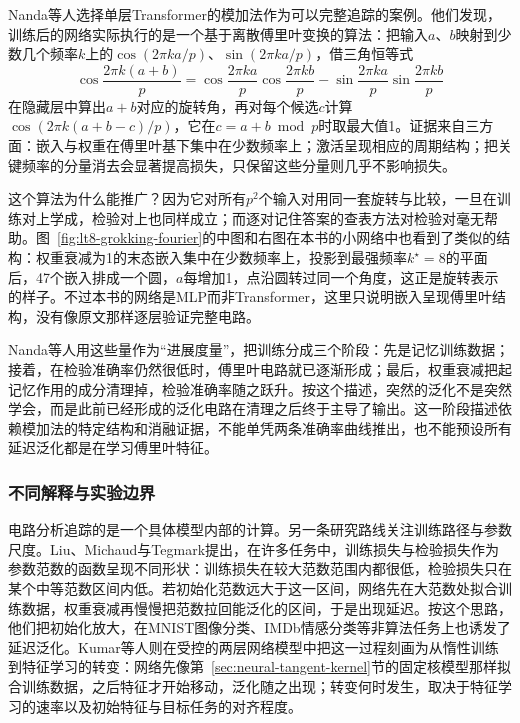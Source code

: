 Nanda等人选择单层Transformer的模加法作为可以完整追踪的案例。他们发现，训练后的网络实际执行的是一个基于离散傅里叶变换的算法：把输入$a$、$b$映射到少数几个频率$k$上的$\cos(2\pi ka/p)$、$\sin(2\pi ka/p)$，借三角恒等式
\[
 \cos\frac{2\pi k(a+b)}p=\cos\frac{2\pi ka}p\cos\frac{2\pi kb}p-\sin\frac{2\pi ka}p\sin\frac{2\pi kb}p
\]
在隐藏层中算出$a+b$对应的旋转角，再对每个候选$c$计算$\cos(2\pi k(a+b-c)/p)$，它在$c=a+b\bmod p$时取最大值1。证据来自三方面：嵌入与权重在傅里叶基下集中在少数频率上；激活呈现相应的周期结构；把关键频率的分量消去会显著提高损失，只保留这些分量则几乎不影响损失。

这个算法为什么能推广？因为它对所有$p^2$个输入对用同一套旋转与比较，一旦在训练对上学成，检验对上也同样成立；而逐对记住答案的查表方法对检验对毫无帮助。图~\ref{fig:lt8-grokking-fourier}的中图和右图在本书的小网络中也看到了类似的结构：权重衰减为1的末态嵌入集中在少数频率上，投影到最强频率$k^\star=8$的平面后，47个嵌入排成一个圆，$a$每增加1，点沿圆转过同一个角度，这正是旋转表示的样子。不过本书的网络是MLP而非Transformer，这里只说明嵌入呈现傅里叶结构，没有像原文那样逐层验证完整电路。

Nanda等人用这些量作为“进展度量”，把训练分成三个阶段：先是记忆训练数据；接着，在检验准确率仍然很低时，傅里叶电路就已逐渐形成；最后，权重衰减把起记忆作用的成分清理掉，检验准确率随之跃升。按这个描述，突然的泛化不是突然学会，而是此前已经形成的泛化电路在清理之后终于主导了输出。这一阶段描述依赖模加法的特定结构和消融证据，不能单凭两条准确率曲线推出，也不能预设所有延迟泛化都是在学习傅里叶特征。

\subsubsection{不同解释与实验边界}

电路分析追踪的是一个具体模型内部的计算。另一条研究路线关注训练路径与参数尺度。Liu、Michaud与Tegmark提出，在许多任务中，训练损失与检验损失作为参数范数的函数呈现不同形状：训练损失在较大范数范围内都很低，检验损失只在某个中等范数区间内低。若初始化范数远大于这一区间，网络先在大范数处拟合训练数据，权重衰减再慢慢把范数拉回能泛化的区间，于是出现延迟。按这个思路，他们把初始化放大，在MNIST图像分类、IMDb情感分类等非算法任务上也诱发了延迟泛化。Kumar等人则在受控的两层网络模型中把这一过程刻画为从惰性训练到特征学习的转变：网络先像第~\ref{sec:neural-tangent-kernel}节的固定核模型那样拟合训练数据，之后特征才开始移动，泛化随之出现；转变何时发生，取决于特征学习的速率以及初始特征与目标任务的对齐程度。

